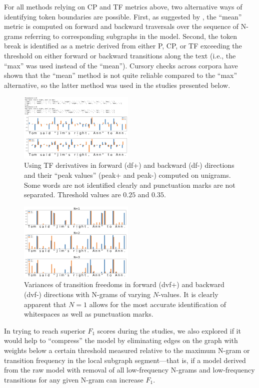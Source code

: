 \documentclass[11pt]{article}
\begin{document}
For all methods relying on CP and TF metrics above, two alternative ways of identifying token boundaries are possible. First, as suggested by \citet{12}, the “mean” metric is computed on forward and backward traversals over the sequence of N-grams referring to corresponding subgraphs in the model. Second, the token break is identified as a metric derived from either P, CP, or TF exceeding the threshold on either forward or backward transitions along the text (i.e.,  the “max” was used instead of the “mean”). Cursory checks across corpora have shown that the “mean” method is not quite reliable compared to the “max” alternative, so the latter method was used in the studies presented below.

\begin{figure}[!ht]
  \includegraphics[width=0.49\textwidth]{imgs/figure4.png}
  \caption{Using TF derivatives in forward (df+) and backward (df-) directions and their “peak values” (peak+ and peak-) computed on unigrams. Some words are not identified clearly and punctuation marks are not separated. Threshold values are $0.25$ and $0.35$.}
\end{figure}

\begin{figure}[!ht]
  \includegraphics[width=0.49\textwidth]{imgs/figure5.png}
  \caption{Variances of transition freedoms in forward (dvf+) and backward (dvf-) directions with N-grams of varying $N$-values. It is clearly apparent that $N=1$ allows for the most accurate identification of whitespaces as well as punctuation marks.}
\end{figure}

In trying to reach superior $F_1$ scores during the studies, we also explored if it would help to “compress” the model by eliminating edges on the graph with weights below a certain threshold measured relative to the maximum N-gram or transition frequency in the local subgraph segment—that is, if a model derived from the raw model with removal of all low-frequency N-grams and low-frequency transitions for any given N-gram can increase $F_1$.
\end{document}
